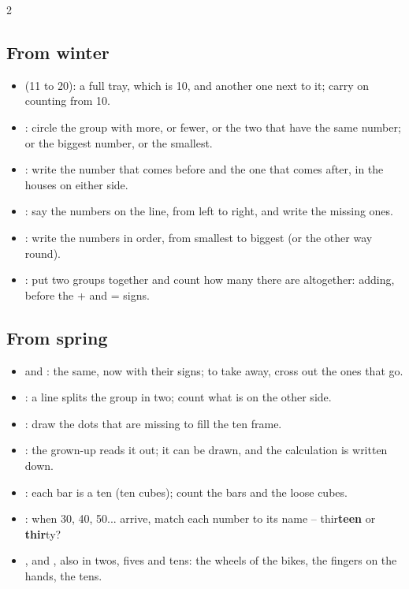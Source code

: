 {\begin{multicols}{2}
\subsection*{From winter}
\begin{itemize}[leftmargin=5mm, itemsep=1pt, topsep=0pt]
\item \textbf{\lblDecena} (11 to 20): a full tray, which is 10, and
  another one next to it; carry on counting from 10.
\item \textbf{\lblCompara}: circle the group with more, or fewer, or the
  two that have the same number; or the biggest number, or the smallest.
\item \textbf{\lblVecinos}: write the number that comes before and the
  one that comes after, in the houses on either side.
\item \textbf{\lblRecta}: say the numbers on the line, from left to
  right, and write the missing ones.
\item \textbf{\lblOrdena}: write the numbers in order, from smallest to
  biggest (or the other way round).
\item \textbf{\lblJunta}: put two groups together and count how many
  there are altogether: adding, before the + and = signs.
\end{itemize}

\subsection*{From spring}
\begin{itemize}[leftmargin=5mm, itemsep=1pt, topsep=0pt]
\item \textbf{\lblSuma} and \textbf{\lblResta}: the same, now with
  their signs; to take away, cross out the ones that go.
\item \textbf{\lblParte}: a line splits the group in two; count what is
  on the other side.
\item \textbf{\lblDiez}: draw the dots that are missing to fill the ten
  frame.
\item \textbf{\lblProblema}: the grown-up reads it out; it can be
  drawn, and the calculation is written down.
\item \textbf{\lblBloques}: each bar is a ten (ten cubes); count the
  bars and the loose cubes.
\item \textbf{\lblNombres}: when 30, 40, 50... arrive, match each number
  to its name -- thir\textbf{teen} or \textbf{thir}ty?
\item \textbf{\lblCompleta}, \textbf{\lblRecta} and \textbf{\lblCuenta},
  also in twos, fives and tens: the wheels of the bikes, the fingers on
  the hands, the tens.
\end{itemize}


\end{multicols}}
